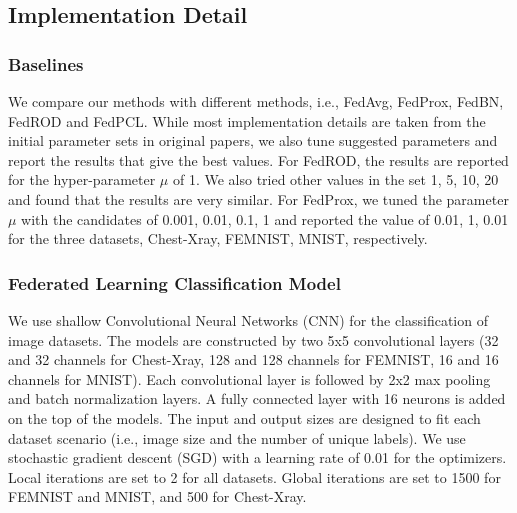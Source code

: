 \documentclass[journal]{IEEEtai}
\begin{document}
\subsection{Implementation Detail}
\subsubsection{Baselines}
We compare our methods with different methods, i.e., FedAvg, FedProx, FedBN, FedROD and FedPCL. While most implementation details are taken from the initial parameter sets in original papers, we also tune suggested parameters and report the results that give the best values. For FedROD, the results are reported for the hyper-parameter $\mu$ of 1. We also tried other values in the set {1, 5, 10, 20} and found that the results are very similar. For FedProx, we tuned the parameter $\mu$ with the candidates of {0.001, 0.01, 0.1, 1} and reported the value of 0.01, 1, 0.01 for the three datasets, Chest-Xray, FEMNIST, MNIST, respectively. 

\subsubsection{Federated Learning Classification Model} We use shallow Convolutional Neural Networks (CNN) for the classification of image datasets. The models are constructed by two 5x5 convolutional layers (32 and 32 channels for Chest-Xray, 128 and 128 channels for FEMNIST, 16 and 16 channels for MNIST). Each convolutional layer is followed by 2x2 max pooling and batch normalization layers. A fully connected layer with 16 neurons is added on the top of the models. The input and output sizes are designed to fit each dataset scenario (i.e., image size and the number of unique labels). We use stochastic gradient descent (SGD) with a learning rate of 0.01 for the optimizers. Local iterations are set to 2 for all datasets. Global iterations are set to 1500 for FEMNIST and MNIST, and 500 for Chest-Xray. 
\end{document}
